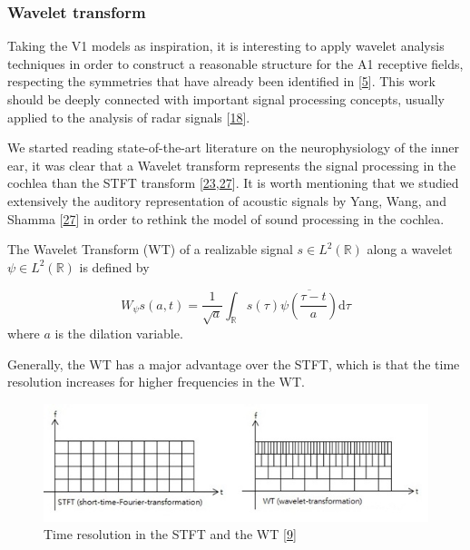 \documentclass[american,]{article}
\theoremstyle{definition}
\theoremstyle{definition}
\theoremstyle{definition}
\theoremstyle{remark}
\begin{document}
\hypertarget{wavelet-transform}{%
\subsubsection{Wavelet transform}\label{wavelet-transform}}

Taking the V1 models as inspiration, it is interesting to apply wavelet analysis techniques
in order to construct a reasonable structure for the A1 receptive fields,
respecting the symmetries that have already been identified in {[}\protect\hyperlink{ref-boscain2021}{5}{]}.
This work should be deeply connected with important signal processing concepts,
usually applied to the analysis of radar signals {[}\protect\hyperlink{ref-mann1992}{18}{]}.

We started reading state-of-the-art literature on the neurophysiology of the inner ear,
it was clear that a Wavelet transform represents the signal processing
in the cochlea than the STFT transform {[}\protect\hyperlink{ref-reimann2011}{23},\protect\hyperlink{ref-yang1992}{27}{]}.
It is worth mentioning that we studied extensively the auditory representation
of acoustic signals by Yang, Wang, and Shamma {[}\protect\hyperlink{ref-yang1992}{27}{]} in order
to rethink the model of sound processing in the cochlea.

The Wavelet Transform (WT) of a realizable signal \(s\in L^2(\mathbb{R})\) along
a wavelet \(\psi\in L^2(\mathbb{R})\) is defined by

\begin{equation}
W_\psi s(a,t) = \frac{1}{\sqrt{a}} \int_\mathbb{R}s(\tau) \overline{\psi\left(\frac{\tau-t}{a}\right)} \mathrm{d}\tau
\end{equation}
where \(a\) is the dilation variable.

Generally, the WT has a major advantage over the STFT, which is that the time resolution
increases for higher frequencies in the WT.

\begin{figure}
\centering
\includegraphics{img/stft_vs_wt.jpg}
\caption{Time resolution in the STFT and the WT {[}\protect\hyperlink{ref-stft_vs_wt}{9}{]}}
\end{figure}
\end{document}
